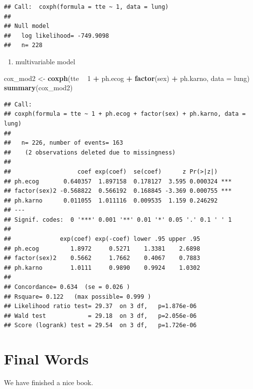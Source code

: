 \documentclass[]{book}
\newenvironment{Shaded}{\begin{snugshade}}{\end{snugshade}}
\newcommand{\KeywordTok}[1]{\textcolor[rgb]{0.13,0.29,0.53}{\textbf{#1}}}
\newcommand{\DataTypeTok}[1]{\textcolor[rgb]{0.13,0.29,0.53}{#1}}
\newcommand{\DecValTok}[1]{\textcolor[rgb]{0.00,0.00,0.81}{#1}}
\newcommand{\StringTok}[1]{\textcolor[rgb]{0.31,0.60,0.02}{#1}}
\newcommand{\OperatorTok}[1]{\textcolor[rgb]{0.81,0.36,0.00}{\textbf{#1}}}
\newcommand{\NormalTok}[1]{#1}
\providecommand{\tightlist}{%
  \setlength{\itemsep}{0pt}\setlength{\parskip}{0pt}}
\theoremstyle{definition}
\theoremstyle{definition}
\theoremstyle{remark}
\begin{document}
\begin{verbatim}
## Call:  coxph(formula = tte ~ 1, data = lung)
## 
## Null model
##   log likelihood= -749.9098 
##   n= 228
\end{verbatim}

\begin{enumerate}
\def\labelenumi{\arabic{enumi}.}
\setcounter{enumi}{1}
\tightlist
\item
  multivariable model
\end{enumerate}

\begin{Shaded}
\begin{Highlighting}[]
\NormalTok{cox_mod2 <-}\StringTok{ }\KeywordTok{coxph}\NormalTok{(tte }\OperatorTok{~}\StringTok{ }\DecValTok{1} \OperatorTok{+}\StringTok{ }\NormalTok{ph.ecog }\OperatorTok{+}\StringTok{ }\KeywordTok{factor}\NormalTok{(sex) }\OperatorTok{+}\StringTok{ }\NormalTok{ph.karno, }\DataTypeTok{data =}\NormalTok{ lung)}
\KeywordTok{summary}\NormalTok{(cox_mod2)}
\end{Highlighting}
\end{Shaded}

\begin{verbatim}
## Call:
## coxph(formula = tte ~ 1 + ph.ecog + factor(sex) + ph.karno, data = lung)
## 
##   n= 226, number of events= 163 
##    (2 observations deleted due to missingness)
## 
##                   coef exp(coef)  se(coef)      z Pr(>|z|)    
## ph.ecog       0.640357  1.897158  0.178127  3.595 0.000324 ***
## factor(sex)2 -0.568822  0.566192  0.168845 -3.369 0.000755 ***
## ph.karno      0.011055  1.011116  0.009535  1.159 0.246292    
## ---
## Signif. codes:  0 '***' 0.001 '**' 0.01 '*' 0.05 '.' 0.1 ' ' 1
## 
##              exp(coef) exp(-coef) lower .95 upper .95
## ph.ecog         1.8972     0.5271    1.3381    2.6898
## factor(sex)2    0.5662     1.7662    0.4067    0.7883
## ph.karno        1.0111     0.9890    0.9924    1.0302
## 
## Concordance= 0.634  (se = 0.026 )
## Rsquare= 0.122   (max possible= 0.999 )
## Likelihood ratio test= 29.37  on 3 df,   p=1.876e-06
## Wald test            = 29.18  on 3 df,   p=2.056e-06
## Score (logrank) test = 29.54  on 3 df,   p=1.726e-06
\end{verbatim}

\chapter{Final Words}\label{final-words}

We have finished a nice book.


\end{document}
